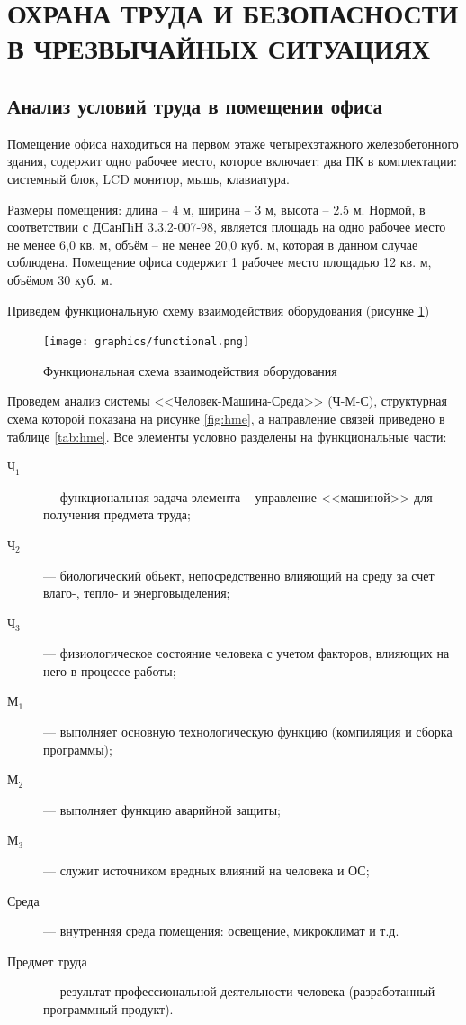 \section{ОХРАНА ТРУДА И БЕЗОПАСНОСТИ В ЧРЕЗВЫЧАЙНЫХ СИТУАЦИЯХ}

\subsection{Анализ условий труда в помещении офиса}

Помещение офиса находиться на первом этаже четырехэтажного железобетонного здания,
содержит одно рабочее место, которое включает: 
два ПК в комплектации: системный блок, LCD монитор, мышь, клавиатура.

Размеры помещения: длина -- 4 м, ширина -- 3 м, высота -- 2.5 м. Нормой, в соответствии с ДСанПiН 3.3.2-007-98, 
является площадь на одно рабочее место не менее 6,0 кв. м, объём -- не менее 20,0 куб. м, которая в данном случае
соблюдена. Помещение офиса содержит 1 рабочее место площадью 12 кв. м, объёмом 30 куб. м.

Приведем функциональную схему взаимодействия оборудования (рисунке \ref{fig:functional})

\begin{figure}[!ht]
    \centering
    \texttt{[image: graphics/functional.png]}
    \caption{Функциональная схема взаимодействия оборудования}
    \label{fig:functional}
\end{figure}

Проведем анализ системы <<Человек-Машина-Среда>> (Ч-М-С), структурная схема которой показана на рисунке 
\ref{fig:hme},
а направление связей приведено в таблице \ref{tab:hme}. Все элементы условно разделены на функциональные части:

\begin{description}
    \item [\(\text{Ч}_1\)] --- функциональная задача элемента -- управление <<машиной>> для получения предмета труда;
    \item [\(\text{Ч}_2\)] --- биологический обьект, непосредственно влияющий на среду за счет влаго-, тепло- и энерговыделения;
    \item [\(\text{Ч}_3\)] --- физиологическое состояние человека с учетом факторов, влияющих на него в процессе работы;
    \item [\(\text{М}_1\)] --- выполняет основную технологическую функцию (компиляция и сборка программы);
    \item [\(\text{М}_2\)] --- выполняет функцию аварийной защиты;
    \item [\(\text{М}_3\)] --- служит источником вредных влияний на человека и ОС;
    \item [\(\text{Среда}\)] --- внутренняя среда помещения: освещение, микроклимат и т.д.
    \item [\(\text{Предмет труда}\)] --- результат профессиональной деятельности человека (разработанный программный продукт).
\end{description}


